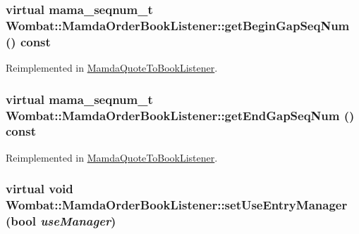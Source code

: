 \hypertarget{classWombat_1_1MamdaOrderBookListener_967ffb9c9c1cd0def13fefed413ad554}{
\subsubsection[getBeginGapSeqNum]{\setlength{\rightskip}{0pt plus 5cm}virtual mama\_\-seqnum\_\-t Wombat::Mamda\-Order\-Book\-Listener::get\-Begin\-Gap\-Seq\-Num () const}}
\label{classWombat_1_1MamdaOrderBookListener_967ffb9c9c1cd0def13fefed413ad554}




Reimplemented in \hyperlink{classMamdaQuoteToBookListener_92174a71081aee1456debac14ad05cf6}{Mamda\-Quote\-To\-Book\-Listener}.\hypertarget{classWombat_1_1MamdaOrderBookListener_c53f97e362bed788ac8daf00c2c8daf3}{
\subsubsection[getEndGapSeqNum]{\setlength{\rightskip}{0pt plus 5cm}virtual mama\_\-seqnum\_\-t Wombat::Mamda\-Order\-Book\-Listener::get\-End\-Gap\-Seq\-Num () const}}
\label{classWombat_1_1MamdaOrderBookListener_c53f97e362bed788ac8daf00c2c8daf3}




Reimplemented in \hyperlink{classMamdaQuoteToBookListener_a40dd460d8463a312bba66e4b689d27e}{Mamda\-Quote\-To\-Book\-Listener}.\hypertarget{classWombat_1_1MamdaOrderBookListener_428fd0fee7ccd623c45333d7787b6f70}{
\subsubsection[setUseEntryManager]{\setlength{\rightskip}{0pt plus 5cm}virtual void Wombat::Mamda\-Order\-Book\-Listener::set\-Use\-Entry\-Manager (bool {\em use\-Manager})}}
\label{classWombat_1_1MamdaOrderBookListener_428fd0fee7ccd623c45333d7787b6f70}


